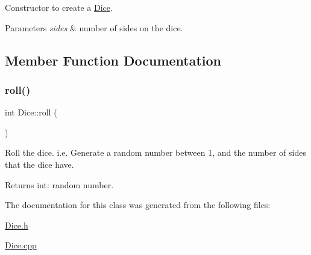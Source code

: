 Constructor to create a \hyperlink{class_dice}{Dice}. 


\begin{DoxyParams}{Parameters}
{\em sides} & number of sides on the dice. \\
\hline
\end{DoxyParams}


\subsection{Member Function Documentation}
\hypertarget{class_dice_a612a16c434160895563d19099ca0b33b}{}\label{class_dice_a612a16c434160895563d19099ca0b33b} 
\subsubsection{\texorpdfstring{roll()}{roll()}}
{\footnotesize\ttfamily int Dice\+::roll (\begin{DoxyParamCaption}{ }\end{DoxyParamCaption})}



Roll the dice. i.\+e. Generate a random number between 1, and the number of sides that the dice have. 

\begin{DoxyReturn}{Returns}
int\+: random number. 
\end{DoxyReturn}


The documentation for this class was generated from the following files\+:\begin{DoxyCompactItemize}
\item 
\hyperlink{_dice_8h}{Dice.\+h}\item 
\hyperlink{_dice_8cpp}{Dice.\+cpp}\end{DoxyCompactItemize}
